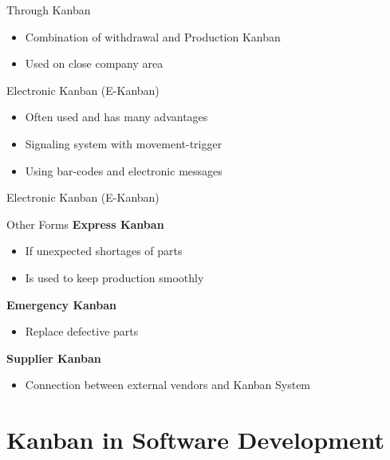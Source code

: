 \documentclass[12pt]{beamer}
\newcommand{\bi}{\begin{itemize}}
\newcommand{\ei}{\end{itemize}}
\begin{document}
		\begin{frame}{\secname}{Through Kanban}
			\bi
				\item Combination of withdrawal and Production Kanban
				\item Used on close company area
			\ei
		\end{frame}
		
		\begin{frame}{\secname}{Electronic Kanban (E-Kanban)}
			\bi
				\item Often used and has many advantages
				\item Signaling system with movement-trigger
				\item Using bar-codes and electronic messages
			\ei
			
		\end{frame}
		
		\begin{frame}{\secname}{Electronic Kanban (E-Kanban)}
		\end{frame}
		
		\begin{frame}{\secname}{Other Forms}
			\textbf{Express Kanban}
			\bi
				\item If unexpected shortages of parts
				\item Is used to keep production smoothly
			\ei
			
			\vspace{0.5cm}
			\pause
			
			\textbf{Emergency Kanban}
			\bi
				\item Replace defective parts
			\ei
			
			\vspace{0.5cm}
			\pause
			
			\textbf{Supplier Kanban}
			\bi
				\item Connection between external vendors and Kanban System
			\ei				
		\end{frame}
				
		
	\section{Kanban in Software Development}
	
\end{document}
